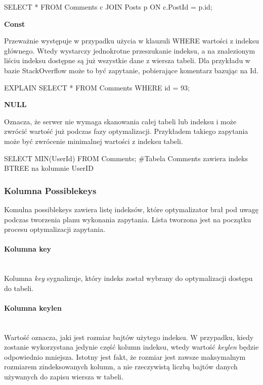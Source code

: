 \begin{spverbatim}
	SELECT * FROM Comments c JOIN Posts p ON c.PostId = p.id;
\end{spverbatim}

\centerline{\textbf{Const}}
\newline

Przeważnie występuje w przypadku użycia w klauzuli WHERE wartości z indeksu głównego. Wtedy wystarczy jednokrotne przeszukanie indeksu, a na znalezionym liściu indeksu dostępne są już wszystkie dane z wiersza tabeli. Dla przykładu w bazie StackOverflow może to być zapytanie, pobierające komentarz bazując na Id.
\begin{spverbatim}
	EXPLAIN SELECT * FROM Comments WHERE id = 93;
\end{spverbatim}

\centerline{\textbf{NULL}}
\newline

Oznacza, że serwer nie wymaga skanowania całej tabeli lub indeksu i może zwrócić wartość już podczas fazy optymalizacji. Przykładem takiego zapytania może być zwrócenie minimalnej wartości z indeksu tabeli.

\begin{spverbatim}
	SELECT MIN(UserId) FROM Comments;
	#Tabela Comments zawiera indeks BTREE na kolumnie UserID
\end{spverbatim}

\subsubsection{Kolumna Possible\textunderscore keys}
Komulna possible\textunderscore keys zawiera listę indeksów, które optymalizator brał pod uwagę podczas tworzenia planu wykonania zapytania. Lista tworzona jest na początku procesu optymalizacji zapytania.

\paragraph{Kolumna key}\leavevmode\\
Kolumna \textit{key} sygnalizuje, który indeks został wybrany do optymalizacji dostępu do tabeli.

\paragraph{Kolumna key\textunderscore len}\leavevmode\\
Wartość oznacza, jaki jest rozmiar bajtów użytego indeksu. W przypadku, kiedy zostanie wykorzystana jedynie część kolumn indeksu, wtedy wartość \textit{key\textunderscore len} będzie odpowiednio mniejsza. Istotny jest fakt, że rozmiar jest zawsze maksymalnym rozmiarem zindeksowanych kolumn, a nie rzeczywistą liczbą bajtów danych używanych do zapisu wiersza w tabeli.

